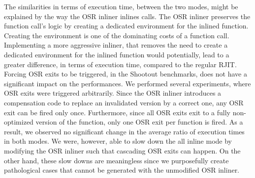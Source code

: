 The similarities in terms of execution time, between the two modes, might be explained by the way the OSR inliner inlines calls.
The OSR inliner preserves the function call's logic by creating a dedicated environment for the inlined function.
Creating the environment is one of the dominating costs of a function call.
Implementing a more aggressive inliner, that removes the need to create a dedicated environment for the inlined function would potentially, lead to a greater difference, in terms of execution time, compared to the regular RJIT.\\

Forcing OSR exits to be triggered, in the Shootout benchmarks, does not have a significant impact on the performances.
We performed several experiments, where OSR exits were triggered arbitrarily.
Since the OSR inliner introduces a compensation code to replace an invalidated version by a correct one, any OSR exit can be fired only once.
Furthermore, since all OSR exits exit to a fully non-optimized version of the function, only one OSR exit per function is fired.
As a result, we observed no significant change in the average ratio of execution times in both modes.
We were, however, able to slow down the all inline mode by modifying the OSR inliner such that cascading OSR exits can happen.
On the other hand, these slow downs are meaningless since we purposefully create pathological cases that cannot be generated with the unmodified OSR inliner.\\ 


